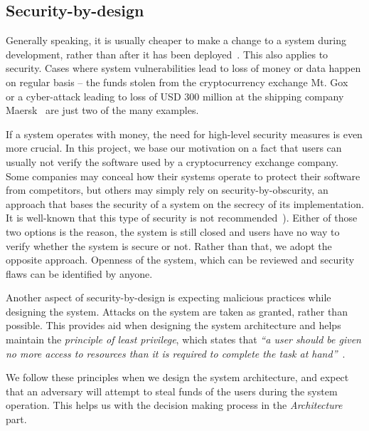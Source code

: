 \subsection{Security-by-design}

Generally speaking, it is usually cheaper to make a change to a system during development, rather than after it has been deployed~\cite[p. 9]{Sommerville2011SoftwareEngineering}. This also applies to security. Cases where system vulnerabilities lead to loss of money or data happen on regular basis -- the funds stolen from the cryptocurrency exchange Mt. Gox~\cite{Popper2014ApparentTimes} or a cyber-attack leading to loss of USD 300 million at the shipping company Maersk~\cite{JordanNovet2017MaerskMillion} are just two of the many examples.

If a system operates with money, the need for high-level security measures is even more crucial. In this project, we base our motivation on a fact that users can usually not verify the software used by a cryptocurrency exchange company. Some companies may conceal how their systems operate to protect their software from competitors, but others may simply rely on security-by-obscurity, an approach that bases the security of a system on the secrecy of its implementation. It is well-known that this type of security is not recommended~\cite{Scarfone2008GuideTechnology}). Either of those two options is the reason, the system is still closed and users have no way to verify whether the system is secure or not. Rather than that, we adopt the opposite approach. Openness of the system, which can be reviewed and security flaws can be identified by anyone.

Another aspect of security-by-design is expecting malicious practices while designing the system. Attacks on the system are taken as granted, rather than possible. This provides aid when designing the system architecture and helps maintain the \textit{principle of least privilege}, which states that \textit{``a user should be given no more access to resources than it is required to complete the task at hand''}~\cite{XiaopuSpecifyingControl}. 

We follow these principles when we design the system architecture, and expect that an adversary will attempt to steal funds of the users during the system operation. This helps us with the decision making process in the \textit{Architecture} part.
